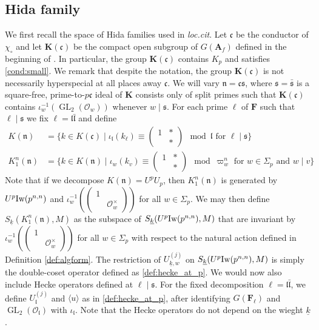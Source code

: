 \documentclass[leqno]{amsart}
\theoremstyle{definition}
\theoremstyle{remark}
\newcommand{\smat}[1]{\left(\begin{smallmatrix} #1 \end{smallmatrix}\right)}
\newcommand{\oo}{\mathcal{O}}
\newcommand{\A}{\mathbf A}
\DeclareMathOperator{\GL}{GL}
\newcommand{\fc}{\mathfrak{c}}
\newcommand{\fs}{\mathfrak{s}}
\newcommand{\fn}{\mathfrak{n}}
\newcommand{\fl}{\mathfrak{l}}
\newcommand{\F}{{\mathbf{F}}} %
\newcommand{\K}{{\mathbf{K}}} %
\newcommand{\rk}[1]{\K({#1})} %
\newcommand{\wt}[1]{\underline{ #1 }}
\newcommand{\Iw}{\textnormal{Iw}} %
\begin{document}
\subsection{Hida family}

We first recall the space of Hida families
used in \textit{loc.cit}.
Let $\fc$ be the conductor of  $\chi_\circ$
and let $\rk{\fc}$ be the compact open subgroup
of $G(\A_f)$ defined in the beginning of \cite[\S 6]{lee}.
In particular, the group $\rk{\fc}$ contains $K_p$
and satisfies \eqref{cond:small}.
We remark that despite the notation,
the group $\rk{\fc}$ is not necessarily
hyperspecial at all places away $\fc$.
We will vary $\fn=\fc\fs$,
where $\fs=\bar{\fs}$ is a
square-free, prime-to-$p\fc$
ideal of  $\K$ consists only of split primes
such that  $\rk{\fc}$
contains  $\iota_w^{-1}(\GL_2(\oo_w))$
whenever $w\mid \fs$.
For each prime $\ell$ of $\F$
such that  $\ell\mid \fs$ we 
fix  $\ell=\fl\bar{\fl}$ and define
\begin{align*}
	K(\fn)&=
	\{
	k\in K(\fc)\mid
	\iota_{\fl}(k_\ell)\equiv
	(\begin{smallmatrix}
		1&*\\&*
	\end{smallmatrix})\mod \fl
	\text{ for } \ell\mid \fs
	\}\\
	K_1^n(\fn)&=
	\{
	k\in K(\fn)\mid
	\iota_{w}(k_v)\equiv
	(\begin{smallmatrix}
		1&*\\&*
	\end{smallmatrix})\mod \varpi_w^n
	\text{ for } w\in \Sigma_p
	\text{ and }w\mid v
	\}
\end{align*}
Note that if we decompose $K(\fn)=U^pU_p$,
then $K^n_1(\fn)$ is generated by $U^p\Iw(p^{n,n})$ 
and $\iota_{w}^{-1}(\smat{1&\\&\oo_w^\times})$
for all $w\in \Sigma_p$.
We may then define 
$S_{\wt{k}}(K^n_1(\fn),M)$
as the subspace of 
$S_{\wt{k}}(U^p\Iw(p^{n,n}),M)$
that are invariant by 
$\iota_{w}^{-1}(\smat{1&\\&\oo_w^\times})$
for all $w\in \Sigma_p$
with respect to the natural action
defined in Definition \ref{def:algform}.
The restriction of $U_{\wt{k},w}^{(j)}$
on $S_{\wt{k}}(U^p\Iw(p^{n,n}),M)$
is simply the double-coset operator 
defined as \eqref{def:hecke_at_p}.
We would now also include
Hecke operators defined at $\ell\mid \fs$.
For the fixed decomposition $\ell=\fl\bar{\fl}$,
we define $U_{\fl}^{(j)}$ and $\langle u\rangle$
as in \eqref{def:hecke_at_p},
after identifying $G(\F_\ell)$
and  $\GL_2(\oo_\fl)$ with  $\iota_\fl$.
Note that the Hecke operators 
do not depend on the wieght  $\wt{k}$.
\end{document}
